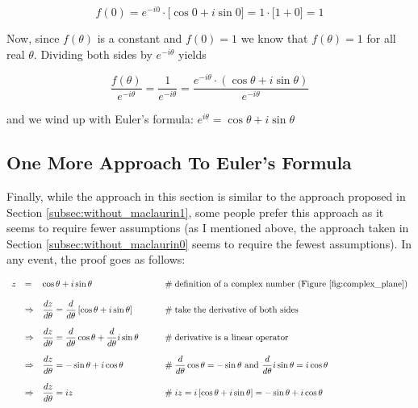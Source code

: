 \documentclass{article}
\theoremstyle{definition}
\begin{document}
\medskip
\begin{equation*}
f(0) = e^{-i0} \cdot \big [\cos 0 + i \sin 0 \big ]  
     = 1 \cdot \big [1 + 0 \big ] = 1
\end{equation*}

\medskip
\bigskip
\noindent
Now, since $f(\theta)$ is a constant and $f(0) = 1$ we know that
$f(\theta) = 1$ for all real $\theta$.  Dividing both sides by
$e^{-i\theta}$ yields

\bigskip
\begin{equation*}
\dfrac{f(\theta)}{e^{-i\theta}} = \dfrac{1}{e^{-i\theta}} =
\dfrac{e^{-i\theta} \cdot (\cos \theta + i \sin
\theta)}{e^{-i\theta}} 
\end{equation*}

\medskip
\bigskip
\noindent
and we wind up with Euler's formula: $e^{i\theta }=\cos \theta
+i\sin \theta$ 


\bigskip
\subsection{One More Approach To Euler's Formula}
\label{subsec:without_maclaurin2}
Finally, while the approach in this section is similar to the
approach proposed in Section \ref{subsec:without_maclaurin1},
some people prefer this approach as it seems to require fewer
assumptions (as I mentioned above, the approach taken in Section
\ref{subsec:without_maclaurin0} seems to require the fewest
assumptions). In any event, the proof goes as follows:


\medskip
\begin{equation*}
\begin{array}{lllll}
z
&=& \cos{\theta}+i\sin{\theta}
                &\qquad \mathrel{\#} \text{definition of a
                complex number (Figure \ref{fig:complex_plane})} \\ 
[12pt]
&\Rightarrow& \dfrac{dz}{d\theta} = \dfrac{d}{d \theta} 
	\left [ \cos{\theta}+i\sin{\theta}  \right ]
                &\qquad \mathrel{\#} \text{take the derivative of
                both sides} \\ 
[14pt]
&\Rightarrow& \dfrac{dz}{d\theta} = \dfrac{d}{d \theta} \cos{\theta} + 
	\dfrac{d}{d \theta} i\sin{\theta}
                &\qquad \mathrel{\#} \text{derivative is a linear
                operator} \\ 
[14pt]
&\Rightarrow& \dfrac{dz}{d\theta} =- \sin{\theta} + i\cos{\theta}
                &\qquad \mathrel{\#} \text{$ \dfrac{d}{d \theta}
                \cos{\theta} = - \sin \theta$ and $\dfrac{d}{d
                \theta} i\sin{\theta} =  i\cos{\theta}$} \\ 
[14pt]
&\Rightarrow& \dfrac{dz}{d\theta} = iz
                &\qquad \mathrel{\#}  i z  = i \left [
                \cos{\theta}+i\sin{\theta}  \right ] =
                -\sin{\theta} + i\cos{\theta} \\
\end{array}
\end{equation*}
\end{document}
